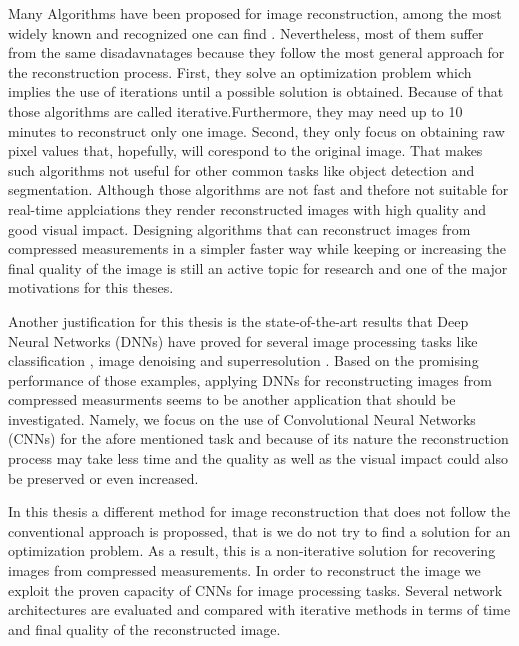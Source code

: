 Many Algorithms have been proposed for image reconstruction, among the most widely known and recognized one can find \cite{metzler2014denoising,dong2014compressive, li2013efficient,mun2009block,chen2011compressed,fowler2011multiscale}. Nevertheless, most of them suffer from the same disadavnatages because they follow the most general approach for the reconstruction process. First, they solve an optimization problem which implies the use of iterations until a possible solution is obtained. Because of that those algorithms are called iterative.Furthermore, they may need up to 10 minutes to reconstruct only one image. Second, they only focus on obtaining raw pixel values that, hopefully, will corespond to the original image. That makes such algorithms not useful for other common tasks like object detection and segmentation. Although those algorithms are not fast and thefore not suitable for real-time applciations they render reconstructed images with high quality and good visual impact. Designing algorithms that can reconstruct images from compressed measurements in a simpler faster way while keeping or increasing the final quality of the image is still an active topic for research and one of the major motivations for this theses. \

Another justification for this thesis is the state-of-the-art results that Deep Neural Networks (DNNs) \cite{lecun2015deep} have proved for several image processing tasks like classification \cite{krizhevsky2012imagenet}, image denoising \cite{burger2012image} and superresolution \cite{dong2014learning}. Based on the promising performance of those examples, applying DNNs for reconstructing images from compressed measurments seems to be another application that should be investigated. Namely, we focus on the use of Convolutional Neural Networks (CNNs) for the afore mentioned task and because of its nature the reconstruction process may take less time and the quality as well as the visual impact could also be preserved or even increased.  

In this thesis a different method for image reconstruction that does not follow the conventional approach is propossed, that is we do not try to find a solution for an optimization problem. As a result, this is a non-iterative solution for recovering images from compressed measurements. In order to reconstruct the image we exploit the proven capacity of CNNs for image processing tasks. Several network architectures are evaluated and compared with iterative methods in terms of time and final quality of the reconstructed image.

